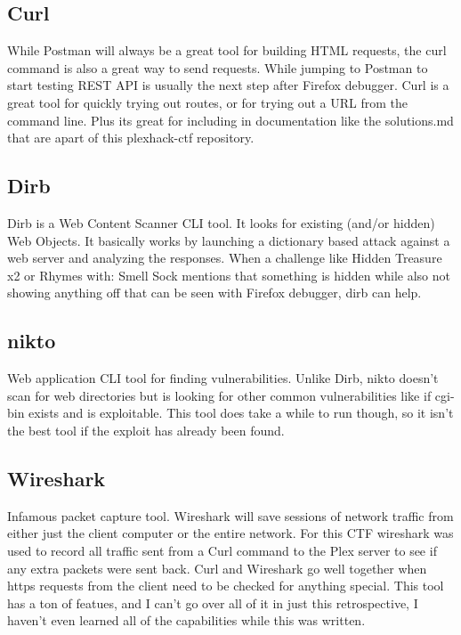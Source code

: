 \documentclass{article}
\begin{document}
\subsection{Curl}

While Postman will always be a great tool for building HTML requests, the curl command is also a great way to send requests.  While jumping to Postman to start testing REST API is usually the next step after Firefox debugger.  Curl is a great tool for quickly trying out routes, or for trying out a URL from the command line.  Plus its great for including in documentation like the solutions.md that are apart of this plexhack-ctf repository.

\subsection{Dirb}

Dirb is a Web Content Scanner CLI tool. It looks for existing (and/or hidden) Web Objects. It basically works by launching a dictionary based attack against a web server and analyzing the responses.  When a challenge like Hidden Treasure x2 or Rhymes with: Smell Sock mentions that something is hidden while also not showing anything off that can be seen with Firefox debugger, dirb can help.

\subsection{nikto}

Web application CLI tool for finding vulnerabilities.  Unlike Dirb, nikto doesn't scan for web directories but is looking for other common vulnerabilities like if cgi-bin exists and is exploitable.  This tool does take a while to run though, so it isn't the best tool if the exploit has already been found.

\subsection{Wireshark}

Infamous packet capture tool.  Wireshark will save sessions of network traffic from either just the client computer or the entire network.  For this CTF wireshark was used to record all traffic sent from a Curl command to the Plex server to see if any extra packets were sent back.  Curl and Wireshark go well together when https requests from the client need to be checked for anything special.  This tool has a ton of featues, and I can't go over all of it in just this retrospective, I haven't even learned all of the capabilities while this was written.
\end{document}
